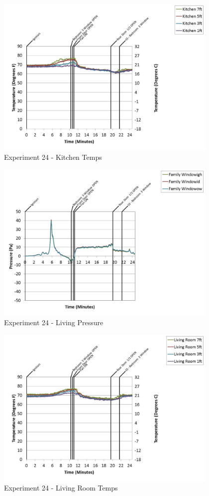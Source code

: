\documentclass{article}
\begin{document}
\begin{appendices}
	\clearpage

	\begin{figure}[h!]
		\centering
		\includegraphics[height=3.05in]{0_Images/Results_Charts/Exp_24_Charts/KitchenTemps.pdf}
		\caption{Experiment 24 - Kitchen Temps}
	\end{figure}
 

	\begin{figure}[h!]
		\centering
		\includegraphics[height=3.05in]{0_Images/Results_Charts/Exp_24_Charts/LivingPressure.pdf}
		\caption{Experiment 24 - Living Pressure}
	\end{figure}
 
	\clearpage

	\begin{figure}[h!]
		\centering
		\includegraphics[height=3.05in]{0_Images/Results_Charts/Exp_24_Charts/LivingRoomTemps.pdf}
		\caption{Experiment 24 - Living Room Temps}
	\end{figure}
 


\end{appendices}
\end{document}
